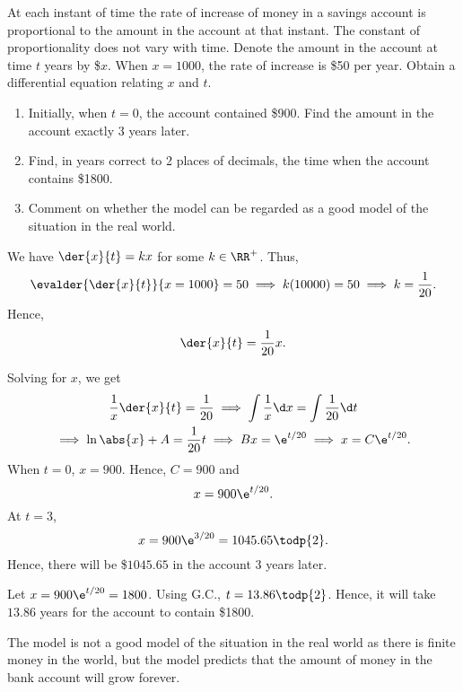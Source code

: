 \begin{problem}
    At each instant of time the rate of increase of money in a savings account is proportional to the amount in the account at that instant. The constant of proportionality does not vary with time. Denote the amount in the account at time $t$ years by \$$x$. When $x = 1000$, the rate of increase is \$50 per year. Obtain a differential equation relating $x$ and $t$. 
    
    \begin{enumerate}
        \item Initially, when $t = 0$, the account contained \$900. Find the amount in the account exactly 3 years later.
        \item Find, in years correct to 2 places of decimals, the time when the account contains \$1800.
        \item Comment on whether the model can be regarded as a good model of the situation in the real world.
    \end{enumerate}
\end{problem}
\begin{solution}
    We have $\der{x}{t} = kx$ for some $k \in \RR^+$. Thus, \[\evalder{\der{x}{t}}{x = 1000} = 50 \implies k(10000) = 50 \implies k = \frac1{20}.\] Hence, \[\der{x}{t} = \frac1{20} x.\]

    \begin{ppart}
        Solving for $x$, we get
        \begin{gather*}
            \frac1x \der{x}{t} = \frac1{20} \implies \int \frac1x \d x = \int \frac1{20} \d t\\
            \implies \ln \abs{x} + A = \frac1{20} t \implies Bx = \e^{t/20} \implies x = C \e^{t/20}.
        \end{gather*}
        When $t = 0$, $x = 900$. Hence, $C = 900$ and \[x = 900 \e^{t/20}.\] At $t = 3$, \[x = 900 \e^{3/20} = 1045.65 \todp{2}.\] Hence, there will be \$$1045.65$ in the account 3 years later.
    \end{ppart}
    \begin{ppart}
        Let $x = 900\e^{t/20} = 1800$. Using G.C., $t = 13.86 \todp{2}$. Hence, it will take $13.86$ years for the account to contain \$1800.
    \end{ppart}
    \begin{ppart}
        The model is not a good model of the situation in the real world as there is finite money in the world, but the model predicts that the amount of money in the bank account will grow forever.
    \end{ppart}
\end{solution}


